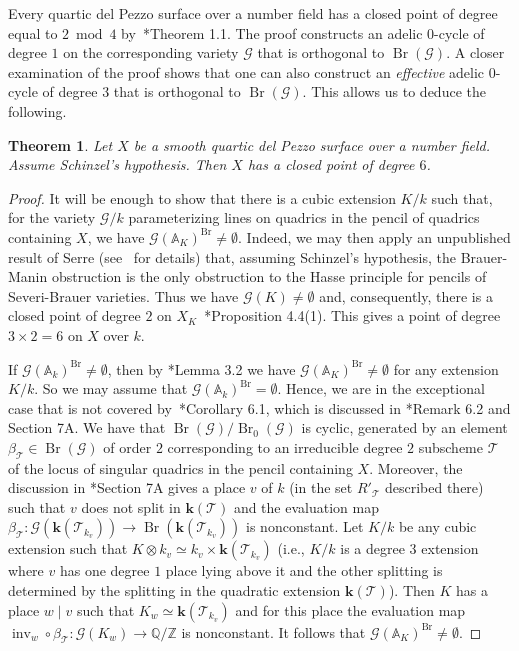 \documentclass[12pt, reqno]{amsart}
\newtheorem{thm}[lemma]{Theorem}
\theoremstyle{definition}
\newcommand{\A}{{\mathbb A}}
\newcommand{\Q}{{\mathbb Q}}
\newcommand{\Z}{{\mathbb Z}}
\newcommand{\kk}{{\mathbf k}}
\newcommand{\calG}{{\mathcal G}}
\newcommand{\scrT}{{\mathscr T}}
\DeclareMathOperator{\inv}{inv}
\DeclareMathOperator{\Br}{Br}
\begin{document}
Every quartic del Pezzo surface over a number field has a closed point of degree equal to $2 \bmod 4$ by~\cite{CV}*{Theorem 1.1}. The proof constructs an adelic $0$-cycle of degree $1$ on the corresponding variety $\calG$ that is orthogonal to $\Br(\calG)$. A closer examination of the proof shows that one can also construct an \emph{effective} adelic $0$-cycle of degree $3$ that is orthogonal to $\Br(\calG)$. This allows us to deduce the following.

\begin{thm}\label{thm:6}
	Let $X$ be a smooth quartic del Pezzo surface over a number field. Assume Schinzel's hypothesis. Then $X$ has a closed point of degree $6$.
\end{thm}
\begin{proof}
	It will be enough to show that there is a cubic extension $K/k$ such that, for the variety $\calG/k$ parameterizing lines on quadrics in the pencil of quadrics containing $X$, we have $\calG(\A_K)^{\Br} \ne \emptyset$. Indeed, we may then apply an unpublished result of Serre (see~ for details)
   that, assuming Schinzel's hypothesis, the Brauer-Manin obstruction is the only obstruction to the Hasse principle for pencils of Severi-Brauer varieties. Thus we have $\calG(K) \ne \emptyset$ and, consequently, there is a closed point of degree $2$ on $X_K$~\cite{CV}*{Proposition 4.4(1)}. This gives a point of degree $3\times 2 = 6$ on $X$ over $k$.
  
   If $\calG(\A_k)^{\Br} \neq \emptyset$, then  by \cite{CV}*{Lemma 3.2} we have $\calG(\A_K)^{\Br} \ne \emptyset$ for any extension $K/k$. So we may assume that $\calG(\A_k)^{\Br} = \emptyset$. Hence, we are in the exceptional case that is not covered by~\cite{CV}*{Corollary 6.1}, which is discussed in \cite{CV}*{Remark 6.2 and Section 7A}. We have that $\Br(\calG)/\Br_0(\calG)$ is cyclic, generated by an element $\beta_\scrT \in \Br(\calG)$ of order $2$ corresponding to an irreducible degree $2$ subscheme $\scrT$ of the locus of singular quadrics in the pencil containing $X$. Moreover, the discussion in \cite{CV}*{Section 7A} gives a place $v$ of $k$ (in the set $R'_\scrT$ described there) such that $v$ does not split in $\kk(\scrT)$ and the evaluation map $\beta_\scrT:\calG(\kk(\scrT_{k_v})) \to \Br(\kk(\scrT_{k_v}))$ is nonconstant. Let $K/k$ be any cubic extension such that $K \otimes k_v \simeq k_v \times \kk(\scrT_{k_v})$ (i.e., \(K/k\) is a degree \(3\) extension where \(v\) has one degree \(1\) place lying above it and the other splitting is determined by the splitting in the quadratic extension \(\kk(\scrT)\)). Then $K$ has a place $w \mid v$ such that $K_w \simeq \kk(\scrT_{k_v})$ and for this place the evaluation map $\inv_w\circ \beta_\scrT: \calG(K_w) \to \Q/\Z$ is nonconstant. It follows that $\calG(\A_K)^{\Br} \ne \emptyset$.
\end{proof}
\end{document}
